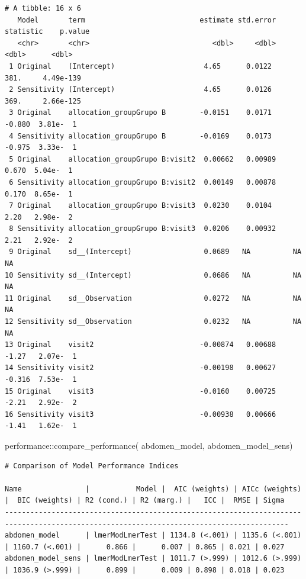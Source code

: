 \documentclass[
  12pt,
]{article}
\newenvironment{Shaded}{\begin{snugshade}}{\end{snugshade}}
\newcommand{\FunctionTok}[1]{\textcolor[rgb]{0.28,0.35,0.67}{#1}}
\newcommand{\NormalTok}[1]{\textcolor[rgb]{0.00,0.23,0.31}{#1}}
\newcommand{\SpecialCharTok}[1]{\textcolor[rgb]{0.37,0.37,0.37}{#1}}
\begin{document}
\begin{verbatim}
# A tibble: 16 x 6
   Model       term                           estimate std.error statistic    p.value
   <chr>       <chr>                             <dbl>     <dbl>     <dbl>      <dbl>
 1 Original    (Intercept)                     4.65      0.0122    381.     4.49e-139
 2 Sensitivity (Intercept)                     4.65      0.0126    369.     2.66e-125
 3 Original    allocation_groupGrupo B        -0.0151    0.0171     -0.880  3.81e-  1
 4 Sensitivity allocation_groupGrupo B        -0.0169    0.0173     -0.975  3.33e-  1
 5 Original    allocation_groupGrupo B:visit2  0.00662   0.00989     0.670  5.04e-  1
 6 Sensitivity allocation_groupGrupo B:visit2  0.00149   0.00878     0.170  8.65e-  1
 7 Original    allocation_groupGrupo B:visit3  0.0230    0.0104      2.20   2.98e-  2
 8 Sensitivity allocation_groupGrupo B:visit3  0.0206    0.00932     2.21   2.92e-  2
 9 Original    sd__(Intercept)                 0.0689   NA          NA     NA        
10 Sensitivity sd__(Intercept)                 0.0686   NA          NA     NA        
11 Original    sd__Observation                 0.0272   NA          NA     NA        
12 Sensitivity sd__Observation                 0.0232   NA          NA     NA        
13 Original    visit2                         -0.00874   0.00688    -1.27   2.07e-  1
14 Sensitivity visit2                         -0.00198   0.00627    -0.316  7.53e-  1
15 Original    visit3                         -0.0160    0.00725    -2.21   2.92e-  2
16 Sensitivity visit3                         -0.00938   0.00666    -1.41   1.62e-  1
\end{verbatim}

\begin{Shaded}
\begin{Highlighting}[]
\NormalTok{performance}\SpecialCharTok{::}\FunctionTok{compare\_performance}\NormalTok{(}
\NormalTok{    abdomen\_model, }
\NormalTok{    abdomen\_model\_sens) }
\end{Highlighting}
\end{Shaded}

\begin{verbatim}
# Comparison of Model Performance Indices

Name               |           Model |  AIC (weights) | AICc (weights) |  BIC (weights) | R2 (cond.) | R2 (marg.) |   ICC |  RMSE | Sigma
-----------------------------------------------------------------------------------------------------------------------------------------
abdomen_model      | lmerModLmerTest | 1134.8 (<.001) | 1135.6 (<.001) | 1160.7 (<.001) |      0.866 |      0.007 | 0.865 | 0.021 | 0.027
abdomen_model_sens | lmerModLmerTest | 1011.7 (>.999) | 1012.6 (>.999) | 1036.9 (>.999) |      0.899 |      0.009 | 0.898 | 0.018 | 0.023
\end{verbatim}
\end{document}
